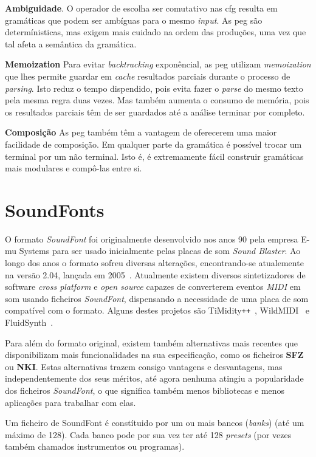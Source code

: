 \textbf{Ambiguidade}. O operador de escolha ser comutativo nas \acrshort{cfg} resulta em gramáticas que podem ser ambíguas para o mesmo \textit{input}. As \acrshort{peg} são determínisticas, mas exigem mais cuidado na ordem das produções, uma vez que tal afeta a semântica da gramática.

\textbf{Memoization} Para evitar \textit{backtracking} exponêncial, as \acrshort{peg} utilizam \textit{memoization} que lhes permite guardar em \textit{cache} resultados parciais durante o processo de \textit{parsing}. Isto reduz o tempo dispendido, pois evita fazer o \textit{parse} do mesmo texto pela mesma regra duas vezes. Mas também aumenta o consumo de memória, pois os resultados parciais têm de ser guardados até a análise terminar por completo.

\textbf{Composição} As \acrlong{peg} também têm a vantagem de oferecerem uma maior facilidade de composição. Em qualquer parte da gramática é possível trocar um terminal por um não terminal. Isto é, é extremamente fácil construir gramáticas mais modulares e compô-las entre si.

\section{SoundFonts}
O formato \textit{SoundFont} foi originalmente desenvolvido nos anos 90 pela empresa E-mu Systems para ser usado inicialmente pelas placas de som \textit{Sound Blaster}. Ao longo dos anos o formato sofreu diversas alterações, encontrando-se atualemente na versão 2.04, lançada em 2005~\cite{soundfont}. Atualmente existem diversos sintetizadores de software \textit{cross platform} e \textit{open source} capazes de converterem eventos \textit{MIDI} em som usando ficheiros \textit{SoundFont}, dispensando a necessidade de uma placa de som compatível com o formato. Alguns destes projetos são TiMidity\verb|++|~\cite{timidity}, WildMIDI~\cite{wild-midi} e FluidSynth~\cite{fluidsynth}.

Para além do formato original, existem também alternativas mais recentes que disponibilizam mais funcionalidades na sua especificação, como os ficheiros \textbf{SFZ} ou \textbf{NKI}. Estas alternativas trazem consigo vantagens e desvantagens, mas independentemente dos seus méritos, até agora nenhuma atingiu a popularidade dos ficheiros \textit{SoundFont}, o que significa também menos bibliotecas e menos aplicações para trabalhar com elas.

Um ficheiro de SoundFont é constítuido por um ou mais bancos (\textit{banks}) (até um máximo de 128). Cada banco pode por sua vez ter até 128 \textit{presets} (por vezes também chamados instrumentos ou programas).

